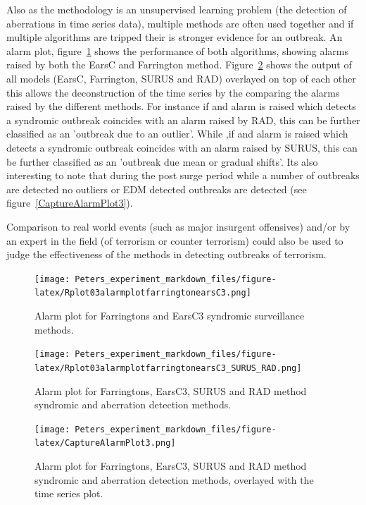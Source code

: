 Also as the methodology is an unsupervised learning problem (the detection of aberrations in time series data), multiple methods are often used together and if multiple algorithms are tripped their is stronger evidence for an outbreak. An alarm plot, figure~\ref{fig:alarmplot1} shows the performance of both algorithms, showing alarms raised by both the EarsC and Farrington method. Figure~\ref{fig:alarmplot2} shows the output of all models (EarsC, Farrington, SURUS and RAD) overlayed on top of each other this allows the deconstruction of the time series by the comparing the alarms raised by the different methods. For instance if and alarm is raised which detects a syndromic outbreak coincides with an alarm raised by RAD, this can be further classified as an 'outbreak due to an outlier'. While ,if and alarm is raised which detects a syndromic outbreak coincides with an alarm raised by SURUS, this can be further classified as an 'outbreak due mean or gradual shifts'. Its also interesting to note that during the post surge period while a number of outbreaks are detected no outliers or EDM detected outbreaks are detected (see figure~\ref{CaptureAlarmPlot3}).

Comparison to real world events (such as major insurgent offensives) and/or by an expert in the field (of terrorism or counter terrorism) could also be used to judge the effectiveness of the methods in detecting outbreaks of terrorism. 


\begin{figure}[t]
\texttt{[image: Peters\_experiment\_markdown\_files/figure-latex/Rplot03alarmplotfarringtonearsC3.png]}
\label{fig:alarmplot1}
\centering
\caption{Alarm plot for Farringtons and EarsC3 syndromic surveillance methods.}
\end{figure}


\begin{figure}[t]
\texttt{[image: Peters\_experiment\_markdown\_files/figure-latex/Rplot03alarmplotfarringtonearsC3\_SURUS\_RAD.png]}
\label{fig:alarmplot2}
\centering
\caption{Alarm plot for Farringtons, EarsC3, SURUS and RAD method syndromic and aberration detection methods.}
\end{figure}


\begin{figure}[t]
\texttt{[image: Peters\_experiment\_markdown\_files/figure-latex/CaptureAlarmPlot3.png]}
\label{fig:CaptureAlarmPlot3}
\centering
\caption{Alarm plot for Farringtons, EarsC3, SURUS and RAD method syndromic and aberration detection methods, overlayed with the time series plot.}
\end{figure}


